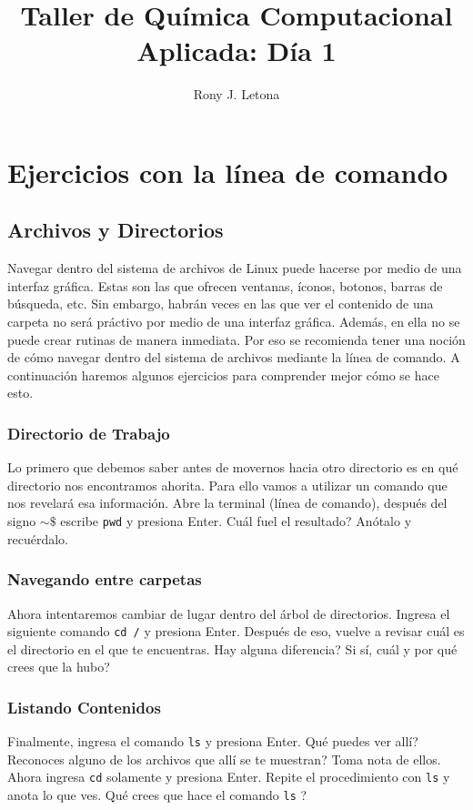 \documentclass[10pt,letterpaper]{article}
\author{Rony J. Letona}
\title{Taller de Qu\'imica Computacional Aplicada: D\'ia 1}
\newcommand{\inlinecode}[1]{
\colorbox{light-gray}{\texttt{#1}}
}
\begin{document}
\maketitle

\section{Ejercicios con la l\'inea de comando}

\subsection{Archivos y Directorios}
Navegar dentro del sistema de archivos de Linux puede hacerse por medio de una interfaz gr\'afica. Estas son las que ofrecen ventanas, \'iconos, botonos, barras de b\'usqueda, etc. Sin embargo, habr\'an veces en las que ver el contenido de una carpeta no ser\'a pr\'activo por medio de una interfaz gr\'afica. Adem\'as, en ella no se puede crear rutinas de manera inmediata. Por eso se recomienda tener una noci\'on de c\'omo navegar dentro del sistema de archivos mediante la l\'inea de comando. A continuaci\'on haremos algunos ejercicios para comprender mejor c\'omo se hace esto.

\subsubsection{Directorio de Trabajo}
Lo primero que debemos saber antes de movernos hacia otro directorio es en qu\'e directorio nos encontramos ahorita. Para ello vamos a utilizar un comando que nos revelar\'a esa informaci\'on. Abre la terminal (l\'inea de comando), despu\'es del signo \inlinecode{$\sim\$ $} escribe \inlinecode{pwd} y presiona Enter. Cu\'al fuel el resultado? An\'otalo y recu\'erdalo.

\subsubsection{Navegando entre carpetas}
Ahora intentaremos cambiar de lugar dentro del \'arbol de directorios. Ingresa el siguiente comando \inlinecode{cd /} y presiona Enter. Despu\'es de eso, vuelve a revisar cu\'al es el directorio en el que te encuentras. Hay alguna diferencia? Si s\'i, cu\'al y por qu\'e crees que la hubo?

\subsubsection{Listando Contenidos}
Finalmente, ingresa el comando \inlinecode{ls} y presiona Enter. Qu\'e puedes ver all\'i? Reconoces alguno de los archivos que all\'i se te muestran? Toma nota de ellos. Ahora ingresa \inlinecode{cd} solamente y presiona Enter. Repite el procedimiento con \inlinecode{ls} y anota lo que ves. Qu\'e crees que hace el comando \inlinecode{ls}?
\end{document}
